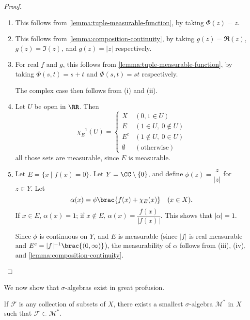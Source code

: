 \begin{proof} \
\begin{enumerate}[label=(\roman*)]
\item This follows from \ref{lemma:tuple-measurable-function}, by taking $\Phi(z)=z$.

\item This follows from \ref{lemma:composition-continuity}, by taking $g(z)=\Re(z)$, $g(z)=\Im(z)$, and $g(z)=|z|$ respectively.

\item For real $f$ and $g$, this follows from \ref{lemma:tuple-measurable-function}, by taking $\Phi(s,t)=s+t$ and $\Phi(s,t)=st$ respectively. 

The complex case then follows from (i) and (ii).

\item Let $U$ be open in $\RR$. Then
\[\chi_E^{-1}(U)=\begin{cases}
X&(0,1\in U)\\
E&(1\in U,\:0\notin U)\\
E^c&(1\notin U,\:0\in U)\\
\emptyset&(\text{otherwise})
\end{cases}\]
all those sets are measurable, since $E$ is measurable.

\item Let $E=\{x\mid f(x)=0\}$. Let $Y=\CC\setminus\{0\}$, and define $\phi(z)=\dfrac{z}{|z|}$ for $z\in Y$. Let
\[\alpha(x)=\phi\brac{f(x)+\chi_E(x)}\quad(x\in X).\]
If $x\in E$, $\alpha(x)=1$; if $x\notin E$, $\alpha(x)=\dfrac{f(x)}{|f(x)|}$. This shows that $|\alpha|=1$.

Since $\phi$ is continuous on $Y$, and $E$ is measurable (since $|f|$ is real measurable and $E^c=|f|^{-1}\brac{(0,\infty)}$), the measurability of $\alpha$ follows from (iii), (iv), and \ref{lemma:composition-continuity}. 
\end{enumerate}
\end{proof}

We now show that $\sigma$-algebras exist in great profusion.

\begin{lemma}
If $\mathcal{F}$ is any collection of subsets of $X$, there exists a smallest $\sigma$-algebra $\mathcal{M}^*$ in $X$ such that $\mathcal{F}\subset\mathcal{M}^*$.
\end{lemma}

